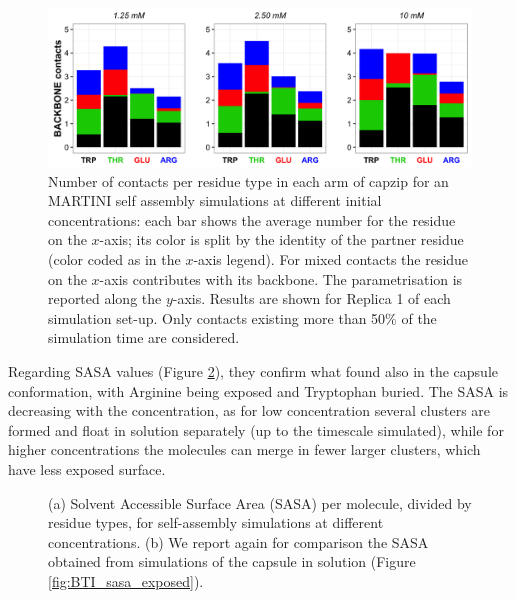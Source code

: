 \begin{figure}[t!]
\centering\includegraphics[width=0.95\linewidth]{3results_capsule/pics/contacts_SA.png} 
\caption[Self-assembly simulations: contacts]{Number of contacts per residue type in each arm of capzip for an MARTINI self assembly simulations at different initial concentrations: each bar shows the average number for the residue on the $x$-axis; its color is split by the identity of the partner residue (color coded as in the $x$-axis legend). For mixed contacts the residue on the $x$-axis contributes with its backbone. The parametrisation is reported along the $y$-axis. Results are shown for Replica 1 of each simulation set-up. Only contacts existing more than 50\% of the simulation time are considered.}
\label{fig:SA_contacts}
\end{figure}
%
Regarding SASA values (Figure \ref{fig:SA_sasa_all}), they confirm what found also in the capsule conformation, with Arginine being exposed and Tryptophan buried. The SASA is decreasing with the concentration, as for low concentration several clusters are formed and float in solution separately (up to the timescale simulated), while for higher concentrations the molecules can merge in fewer larger clusters, which have less exposed surface.
%
\begin{figure}[t!]
\caption[Self-assembly simulations: SASA]{(a) Solvent Accessible Surface Area (SASA) per molecule, divided by residue types, for self-assembly simulations at different concentrations. (b) We report again for comparison the SASA obtained from simulations of the capsule in solution (Figure \ref{fig:BTI_sasa_exposed}).}
\label{fig:SA_sasa_all}
\end{figure}

